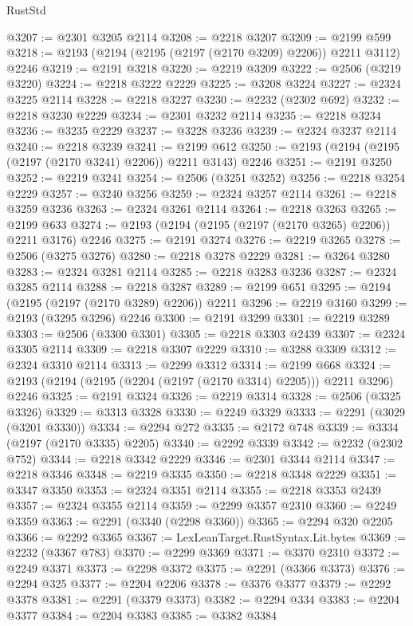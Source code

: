 \begin{lexlean}{RustStd}
\begin{coremodule}
@3207 := @2301 @3205 @2114
@3208 := @2218 @3207
@3209 := @2199 @599
@3218 := @2193 (@2194 (@2195 (@2197 (@2170 @3209) @2206)) @2211 @3112) @2246
@3219 := @2191 @3218
@3220 := @2219 @3209
@3222 := @2506 (@3219 @3220)
@3224 := @2218 @3222 @2229
@3225 := @3208 @3224
@3227 := @2324 @3225 @2114
@3228 := @2218 @3227
@3230 := @2232 (@2302 @692)
@3232 := @2218 @3230 @2229
@3234 := @2301 @3232 @2114
@3235 := @2218 @3234
@3236 := @3235 @2229
@3237 := @3228 @3236
@3239 := @2324 @3237 @2114
@3240 := @2218 @3239
@3241 := @2199 @612
@3250 := @2193 (@2194 (@2195 (@2197 (@2170 @3241) @2206)) @2211 @3143) @2246
@3251 := @2191 @3250
@3252 := @2219 @3241
@3254 := @2506 (@3251 @3252)
@3256 := @2218 @3254 @2229
@3257 := @3240 @3256
@3259 := @2324 @3257 @2114
@3261 := @2218 @3259 @3236
@3263 := @2324 @3261 @2114
@3264 := @2218 @3263
@3265 := @2199 @633
@3274 := @2193 (@2194 (@2195 (@2197 (@2170 @3265) @2206)) @2211 @3176) @2246
@3275 := @2191 @3274
@3276 := @2219 @3265
@3278 := @2506 (@3275 @3276)
@3280 := @2218 @3278 @2229
@3281 := @3264 @3280
@3283 := @2324 @3281 @2114
@3285 := @2218 @3283 @3236
@3287 := @2324 @3285 @2114
@3288 := @2218 @3287
@3289 := @2199 @651
@3295 := @2194 (@2195 (@2197 (@2170 @3289) @2206)) @2211
@3296 := @2219 @3160
@3299 := @2193 (@3295 @3296) @2246
@3300 := @2191 @3299
@3301 := @2219 @3289
@3303 := @2506 (@3300 @3301)
@3305 := @2218 @3303 @2439
@3307 := @2324 @3305 @2114
@3309 := @2218 @3307 @2229
@3310 := @3288 @3309
@3312 := @2324 @3310 @2114
@3313 := @2299 @3312
@3314 := @2199 @668
@3324 := @2193 (@2194 (@2195 (@2204 (@2197 (@2170 @3314) @2205))) @2211 @3296) @2246
@3325 := @2191 @3324
@3326 := @2219 @3314
@3328 := @2506 (@3325 @3326)
@3329 := @3313 @3328
@3330 := @2249 @3329
@3333 := @2291 (@3029 (@3201 @3330))
@3334 := @2294 @272
@3335 := @2172 @748
@3339 := @3334 (@2197 (@2170 @3335) @2205)
@3340 := @2292 @3339
@3342 := @2232 (@2302 @752)
@3344 := @2218 @3342 @2229
@3346 := @2301 @3344 @2114
@3347 := @2218 @3346
@3348 := @2219 @3335
@3350 := @2218 @3348 @2229
@3351 := @3347 @3350
@3353 := @2324 @3351 @2114
@3355 := @2218 @3353 @2439
@3357 := @2324 @3355 @2114
@3359 := @2299 @3357 @2310
@3360 := @2249 @3359
@3363 := @2291 (@3340 (@2298 @3360))
@3365 := @2294 @320 @2205
@3366 := @2292 @3365
@3367 := LexLeanTarget.RustSyntax.Lit.bytes
@3369 := @2232 (@3367 @783)
@3370 := @2299 @3369
@3371 := @3370 @2310
@3372 := @2249 @3371
@3373 := @2298 @3372
@3375 := @2291 (@3366 @3373)
@3376 := @2294 @325
@3377 := @2204 @2206
@3378 := @3376 @3377
@3379 := @2292 @3378
@3381 := @2291 (@3379 @3373)
@3382 := @2294 @334
@3383 := @2204 @3377
@3384 := @2204 @3383
@3385 := @3382 @3384

\end{coremodule}
\end{lexlean}

